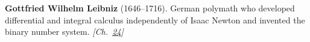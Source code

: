\textbf{Gottfried Wilhelm Leibniz} (1646–1716). German polymath who developed differential and integral calculus independently of Isaac Newton and invented the binary number system. \emph{[Ch.~\hyperref[ch:4dspacetime]{24}]}

